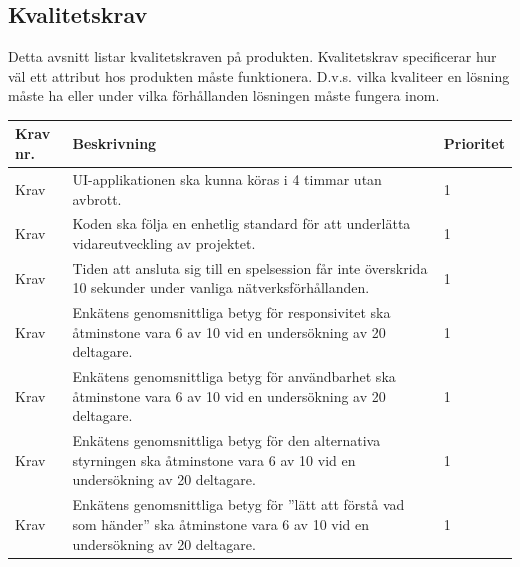 \documentclass[10pt]{article}
\newcounter{indexcounter}
\newcommand{\Krav}[2]{
	\stepcounter{indexcounter}
	Krav \arabic{indexcounter} & #1 & #2 \\ \hline
}
\begin{document}
	\subsection{Kvalitetskrav}
	Detta avsnitt listar kvalitetskraven på produkten. Kvalitetskrav specificerar hur väl ett attribut hos produkten måste funktionera. D.v.s. vilka kvaliteer en lösning måste ha eller under vilka förhållanden lösningen måste fungera inom.  \\
	
		\begin{tabular}{|p{2cm}|p{8cm}|p{2cm}|}
		\hline
		\textbf{Krav nr.} & \textbf{Beskrivning} & \textbf{Prioritet} \\ \hline
		
		\Krav{UI-applikationen ska kunna köras i 4 timmar utan avbrott.}{1}
		\Krav{Koden ska följa en enhetlig standard\cite{bib-kvalitetsplan} för att underlätta vidareutveckling av projektet.}{1}
		\Krav{Tiden att ansluta sig till en spelsession får inte överskrida 10 sekunder under vanliga nätverksförhållanden.}{1}
        \Krav{Enkätens\cite{bib-kvalitetsplan} genomsnittliga betyg för responsivitet ska åtminstone vara 6 av 10 vid en undersökning av 20 deltagare.}{1}
		\Krav{Enkätens\cite{bib-kvalitetsplan} genomsnittliga betyg för användbarhet ska åtminstone vara 6 av 10 vid en undersökning av 20 deltagare.}{1}
		\Krav{Enkätens\cite{bib-kvalitetsplan} genomsnittliga betyg för den alternativa styrningen ska åtminstone vara 6 av 10 vid en undersökning av 20 deltagare.}{1}
		\Krav{Enkätens\cite{bib-kvalitetsplan} genomsnittliga betyg för ''lätt att förstå vad som händer'' ska åtminstone vara 6 av 10 vid en undersökning av 20 deltagare.}{1}
				
	\end{tabular}
	

\pagebreak

\printbibliography
{}
\end{document}
